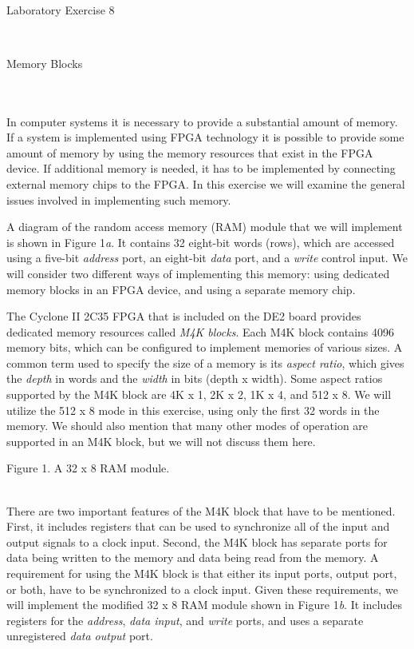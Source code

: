 \documentclass[psfig,10pt,fullpage]{article}
\begin{document}
~\\
\centerline{\huge Laboratory Exercise 8}
~\\
\centerline{\large Memory Blocks}
~\\
~\\

In computer systems it is necessary to provide a substantial amount of memory.
If a system is implemented using FPGA technology it is possible
to provide some amount of memory by using the memory resources that exist
in the FPGA device. If additional memory is needed, it has to be implemented
by connecting external memory chips to the FPGA. 
In this exercise we will examine the general issues involved in implementing 
such memory.

A diagram of the random access memory (RAM) module that we will implement is shown in Figure
1{\it a}. It contains 32 eight-bit words (rows), which are accessed using a five-bit
{\it address} port, an eight-bit {\it data} port, and a {\it write} control input. We will
consider two different ways of implementing this memory: using dedicated memory
blocks in an FPGA device, and using a separate memory chip. 

The Cyclone II 2C35 FPGA that
is included on the DE2 board provides dedicated memory resources called {\it M4K
blocks}. Each M4K block contains 4096 memory bits, which can be configured to implement 
memories of various sizes. A common term used to specify the size of a
memory is its {\it aspect ratio}, which gives the {\it depth} in words and the
{\it width} in bits (depth {\sf x} width).
Some aspect ratios supported by the M4K block are 4K {\sf x} 1, 2K {\sf x} 2,
1K {\sf x} 4, and 512 {\sf x} 8. We will utilize the 512 {\sf x} 8 mode in this exercise,
using only the first 32 words in the memory. We should also mention
that many other modes of operation are supported in an M4K block, but we
will not discuss them here.

\begin{figure}[H]
\scriptsize
\centerline{
\hbox{}}
\end{figure}
\centerline{Figure 1.  A 32 {\sf x} 8 RAM module.}
~\\
There are two important features of the M4K block that have to be mentioned.
First, it includes registers that can be used to synchronize all of the 
input and output signals to a clock input. Second, the M4K block has separate
ports for data being written to the memory and data being read from the memory. A
requirement for using the M4K block is that either its input ports, output port, or
both, have to be synchronized to a clock input. Given these requirements,
we will implement the modified 32 {\sf x} 8 RAM module shown in Figure 1{\it b}. It includes 
registers for the {\it address}, {\it data input}, and {\it write} ports, and uses a separate
unregistered {\it data output} port.
\end{document}
